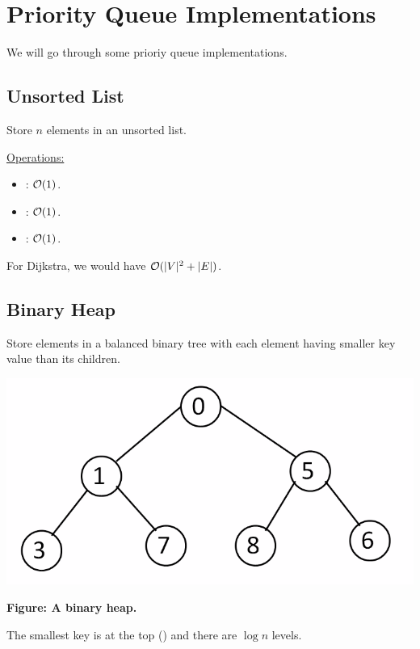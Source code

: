 \documentclass[letterpaper]{article}
\begin{document}
\section{Priority Queue Implementations}
We will go through some prioriy queue implementations. 

\subsection{Unsorted List}
Store $n$ elements in an unsorted list. 

\bigskip 

\underline{Operations:}
\begin{itemize}
    \item {}: $\mathcal{O}(1)$.
    \item {}: $\mathcal{O}(1)$.
    \item {}: $\mathcal{O}(1)$.
\end{itemize}
For Dijkstra, we would have $\mathcal{O}(|V|^2 + |E|)$. 

\subsection{Binary Heap}
Store elements in a balanced binary tree with each element having smaller key value than its children.

\begin{center}
    \includegraphics[scale=0.5]{../assets/bin_heap.png}

    \textbf{Figure: A binary heap.}
\end{center}
The smallest key is at the top () and there are $\log{n}$ levels. 

\bigskip 
\end{document}
